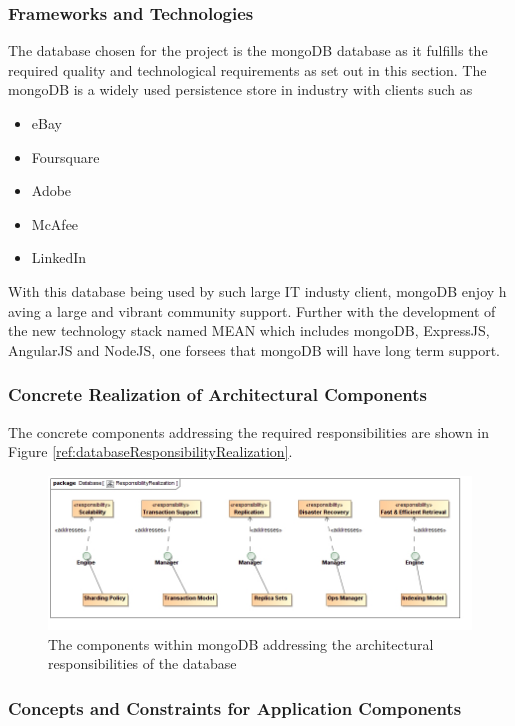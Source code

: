 \subsubsection{Frameworks and Technologies}
The database chosen for the project is the mongoDB database as it fulfills the
required quality and technological requirements as set out in this section. The
mongoDB is a widely used persistence store in industry with clients such as
\begin{itemize}
	\item eBay
	\item Foursquare
	\item Adobe
	\item McAfee
	\item LinkedIn
\end{itemize}

With this database being used by such large IT industy client, mongoDB enjoy h
aving a large and vibrant community support. Further with the development of
the new technology stack named MEAN which includes mongoDB, ExpressJS, AngularJS
and NodeJS, one forsees that mongoDB will have long term support.

\subsubsection{Concrete Realization of Architectural Components}
The concrete components addressing the required responsibilities are shown in Figure \ref{ref:databaseResponsibilityRealization}.
\begin{figure}[H]
	\begin{center}
	\includegraphics[scale=0.5]{../Diagrams and Charts/Database/ResponsibilityRealization.jpg}
	\caption{The components within mongoDB addressing the architectural responsibilities of the database}
	\label{fig:databaseResponsibilityRealization}
	\end{center}
\end{figure}

\subsubsection{Concepts and Constraints for Application Components}